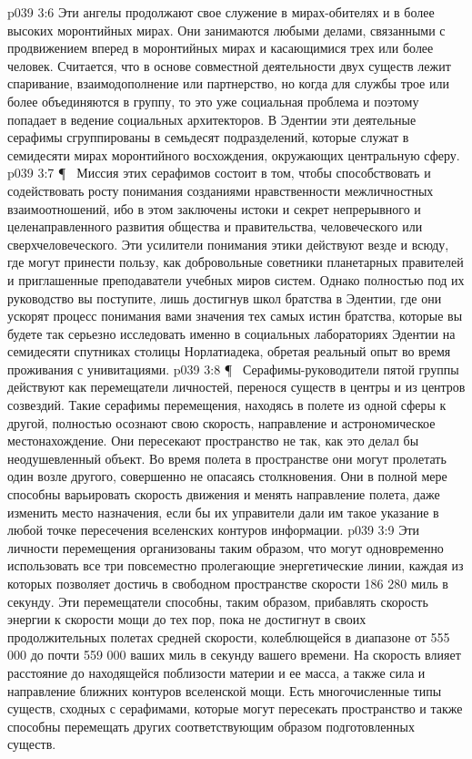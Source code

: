\vs p039 3:6 Эти ангелы продолжают свое служение в мирах\hyp{}обителях и в более высоких моронтийных мирах. Они занимаются любыми делами, связанными с продвижением вперед в моронтийных мирах и касающимися трех или более человек. Считается, что в основе совместной деятельности двух существ лежит спаривание, взаимодополнение или партнерство, но когда для службы трое или более объединяются в группу, то это уже социальная проблема и поэтому попадает в ведение социальных архитекторов. В Эдентии эти деятельные серафимы сгруппированы в семьдесят подразделений, которые служат в семидесяти мирах моронтийного восхождения, окружающих центральную сферу.
\vs p039 3:7 \P\ \bibnobreakspace {} Миссия этих серафимов состоит в том, чтобы способствовать и содействовать росту понимания созданиями нравственности межличностных взаимоотношений, ибо в этом заключены истоки и секрет непрерывного и целенаправленного развития общества и правительства, человеческого или сверхчеловеческого. Эти усилители понимания этики действуют везде и всюду, где могут принести пользу, как добровольные советники планетарных правителей и приглашенные преподаватели учебных миров систем. Однако полностью под их руководство вы поступите, лишь достигнув школ братства в Эдентии, где они ускорят процесс понимания вами значения тех самых истин братства, которые вы будете так серьезно исследовать именно в социальных лабораториях Эдентии на семидесяти спутниках столицы Норлатиадека, обретая реальный опыт во время проживания с унивитациями.
\vs p039 3:8 \P\ \bibnobreakspace {} Серафимы\hyp{}руководители пятой группы действуют как перемещатели личностей, перенося существ в центры и из центров созвездий. Такие серафимы перемещения, находясь в полете из одной сферы к другой, полностью осознают свою скорость, направление и астрономическое местонахождение. Они пересекают пространство не так, как это делал бы неодушевленный объект. Во время полета в пространстве они могут пролетать один возле другого, совершенно не опасаясь столкновения. Они в полной мере способны варьировать скорость движения и менять направление полета, даже изменить место назначения, если бы их управители дали им такое указание в любой точке пересечения вселенских контуров информации.
\vs p039 3:9 Эти личности перемещения организованы таким образом, что могут одновременно использовать все три повсеместно пролегающие энергетические линии, каждая из которых позволяет достичь в свободном пространстве скорости 186 280 миль в секунду. Эти перемещатели способны, таким образом, прибавлять скорость энергии к скорости мощи до тех пор, пока не достигнут в своих продолжительных полетах средней скорости, колеблющейся в диапазоне от 555 000 до почти 559 000 ваших миль в секунду вашего времени. На скорость влияет расстояние до находящейся поблизости материи и ее масса, а также сила и направление ближних контуров вселенской мощи. Есть многочисленные типы существ, сходных с серафимами, которые могут пересекать пространство и также способны перемещать других соответствующим образом подготовленных существ.
